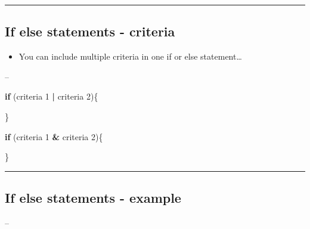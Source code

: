 \documentclass[]{article}
\newenvironment{Shaded}{\begin{snugshade}}{\end{snugshade}}
\newcommand{\ControlFlowTok}[1]{\textcolor[rgb]{0.13,0.29,0.53}{\textbf{#1}}}
\newcommand{\DecValTok}[1]{\textcolor[rgb]{0.00,0.00,0.81}{#1}}
\newcommand{\NormalTok}[1]{#1}
\newcommand{\OperatorTok}[1]{\textcolor[rgb]{0.81,0.36,0.00}{\textbf{#1}}}
\newcommand{\StringTok}[1]{\textcolor[rgb]{0.31,0.60,0.02}{#1}}
\providecommand{\tightlist}{%
  \setlength{\itemsep}{0pt}\setlength{\parskip}{0pt}}
\begin{document}
\begin{center}\rule{0.5\linewidth}{\linethickness}\end{center}

\hypertarget{if-else-statements---criteria}{%
\subsection{If else statements -
criteria}\label{if-else-statements---criteria}}

\begin{itemize}
\tightlist
\item
  You can include multiple criteria in one if or else statement\ldots{}
\end{itemize}

--

\begin{Shaded}
\begin{Highlighting}[]
\ControlFlowTok{if}\NormalTok{ (criteria }\DecValTok{1} \OperatorTok{|}\StringTok{ }\NormalTok{criteria }\DecValTok{2}\NormalTok{)\{}
  
\NormalTok{\}}

\ControlFlowTok{if}\NormalTok{ (criteria }\DecValTok{1} \OperatorTok{&}\StringTok{ }\NormalTok{criteria }\DecValTok{2}\NormalTok{)\{}
  
\NormalTok{\}}
\end{Highlighting}
\end{Shaded}

\begin{center}\rule{0.5\linewidth}{\linethickness}\end{center}

\hypertarget{if-else-statements---example}{%
\subsection{If else statements -
example}\label{if-else-statements---example}}

--
\end{document}
